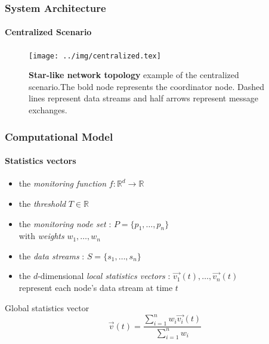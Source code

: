 \documentclass[hyperref={pdfpagelabels=false}]{beamer}
\begin{document}

\begin{frame} \frametitle{System Architecture} \framesubtitle{Centralized Scenario}
\begin{figure}[H]
\centering
\vspace{-1cm}
\texttt{[image: ../img/centralized.tex]}
\caption{\textbf{Star-like network topology} example of the centralized scenario.The bold node represents the coordinator node. Dashed lines represent data streams and half arrows represent message exchanges.} 
\end{figure}
\end{frame}

\begin{frame} \frametitle{Computational Model}\framesubtitle{Statistics vectors}

\begin{itemize}
\item the \emph{monitoring function} $f:\mathbb{R}^d \to \mathbb{R}$
\item the \emph{threshold} $T \in \mathbb{R}$
\item the \emph{monitoring node set} : $P=\{p_1, \dots, p_n\}$\\\quad with \emph{weights} $w_1, \dots, w_n$
\item the \emph{data streams} : $S=\{s_1, \dots, s_n\}$
\item the $d$-dimensional \emph{local statistics vectors} : $\vec{v_1}(t), \dots, \vec{v_n}(t)$\\\quad represent each node's data stream at time $t$
\end{itemize}
\begin{block}{Global statistics vector}
\vspace{0.2cm}
\begin{equation}
\vec{v}(t)=\frac{\sum_{i=1}^n{w_i\vec{v_i}(t)}}{\sum_{i=1}^n{w_i}}
\label{form:globalStatsVector}
\end{equation}
\vspace{0.2cm}
\end{block}
\end{frame}
\end{document}

